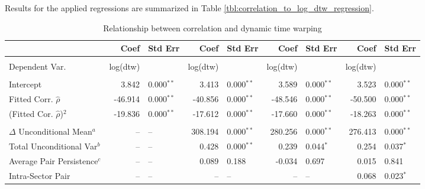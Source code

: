 \documentclass[12pt]{report}
\begin{document}
Results for the applied regressions are summarized in Table \ref{tbl:correlation_to_log_dtw_regression}.

\begin{table}[!ht]
    \fontsize{8pt}{8pt}\selectfont
    \caption{Relationship between correlation and dynamic time warping}
    \centering
    \begin{tabular}{l r l r l r l r l}
        \midrule
         & Coef & Std Err & Coef & Std Err & Coef & Std Err & Coef & Std Err  \\
        \midrule
                                                                                                                                                        \\
        Dependent Var.                     & log(dtw)&              & log(dtw)&               &     log(dtw)&                & log(dtw)&                \\
                                                                                                                                                        \\
        Intercept                          &   3.842 & 0.000$^{**}$ &   3.413 & 0.000$^{**}$  &       3.589 & 0.000$^{**}$   &   3.523 & 0.000$^{**}$   \\
        Fitted Corr. $\hat{\rho}$          & -46.914 & 0.000$^{**}$ & -40.856 & 0.000$^{**}$  &     -48.546 & 0.000$^{**}$   & -50.500 & 0.000$^{**}$   \\
        (Fitted Cor. $\hat{\rho}$)$^{2}$   & -19.836 & 0.000$^{**}$ & -17.612 & 0.000$^{**}$  &     -17.660 & 0.000$^{**}$   & -18.263 & 0.000$^{**}$   \\
                                                                                                                                                        \\        
        $\Delta$ Unconditional Mean$^{a}$  &      -- & --           & 308.194 & 0.000$^{**}$  &     280.256 & 0.000$^{**}$   & 276.413 & 0.000$^{**}$   \\
        Total Unconditional Var$^{b}$      &      -- & --           &   0.428 & 0.000$^{**}$  &       0.239 & 0.044$^{*}$    &   0.254 & 0.037$^{*}$    \\
        Average Pair Persistence$^{c}$     &      -- & --           &   0.089 & 0.188         &      -0.034 & 0.697          &   0.015 & 0.841          \\
        Intra-Sector Pair                  &      -- & --           &      -- & --            &          -- & --             &   0.068 & 0.023$^{*}$    \\

\end{tabular}
\end{table}
\end{document}
